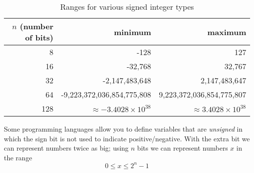 \begin{table}[h]
\centering
\begin{tabular}{r|r|r}
$n$ (number of bits) & minimum & maximum \\
\hline\hline
8 & -128 & 127 \\
16 & -32,768 & 32,767 \\
32 & -2,147,483,648 & 2,147,483,647 \\
64 & -9,223,372,036,854,775,808 & 9,223,372,036,854,775,807 \\
128 & $\approx -3.4028 \times 10^{38}$ & $\approx 3.4028 \times 10^{38}$ \\
\end{tabular}
\caption{Ranges for various signed integer types}
\label{table:rangesForIntegerTypes}
\end{table}

Some programming languages allow you to define variables that are \emph{unsigned} in which 
the sign bit is not used to indicate positive/negative.  With the extra bit we can represent numbers
twice as big; using $n$ bits we can represent numbers $x$ in the range
  $$0 \leq x \leq 2^n -1$$


